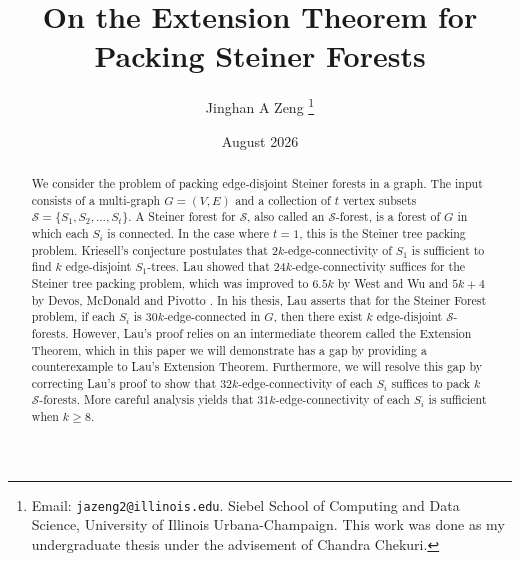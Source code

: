 \documentclass{article}
\begin{document}


\title{On the Extension Theorem for Packing Steiner Forests}
\author{Jinghan A Zeng \footnote{Email: \texttt{jazeng2@illinois.edu}. Siebel School of Computing and Data Science, University of Illinois Urbana-Champaign. This work was done as my undergraduate thesis under the advisement of Chandra Chekuri.}}


\date{August 2026}

\maketitle

\begin{abstract}

We consider the problem of packing edge-disjoint Steiner forests in a graph.
The input consists of a multi-graph $G=(V,E)$ and a collection of $t$ vertex subsets $\mathcal{S} = \{S_1,S_2,\ldots,S_t\}$. A Steiner forest for $\mathcal{S}$, also called an $\mathcal{S}$-forest, is a forest of $G$ in which each $S_i$ is connected. In the case where $t=1$, this is the Steiner tree packing problem. Kriesell's conjecture postulates that $2k$-edge-connectivity of $S_1$ is sufficient to find $k$ edge-disjoint $S_1$-trees. Lau \cite{lau-thesis} showed that $24k$-edge-connectivity suffices for the Steiner tree packing problem, which was improved to $6.5k$ by West and Wu \cite{westwu} and $5k+4$ by Devos, McDonald and Pivotto \cite{devos2016packing}. In his thesis, Lau \cite{lau-thesis} asserts that for the Steiner Forest problem, if each $S_i$ is $30k$-edge-connected in $G$, then there exist $k$ edge-disjoint $\mathcal{S}$-forests. However, Lau's proof relies on an intermediate theorem called the Extension Theorem, which in this paper we will demonstrate has a gap by providing a counterexample to Lau's Extension Theorem. Furthermore, we will resolve this gap by correcting Lau's proof to show that $32k$-edge-connectivity of each $S_i$ suffices to pack $k$ $\mathcal{S}$-forests. More careful analysis yields that $31k$-edge-connectivity of each $S_i$ is sufficient when $k \geq 8$. 

\end{abstract}
\end{document}
